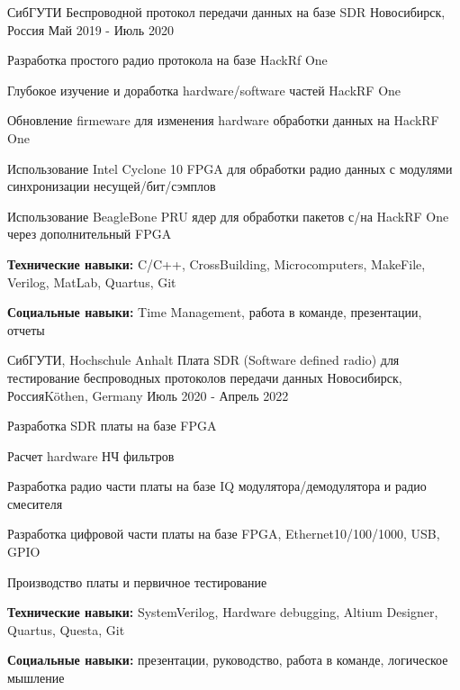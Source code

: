 

\begin{cventries}

  \cventry
    {СибГУТИ} %
    {Беспроводной протокол передачи данных на базе SDR} %
    {Новосибирск, Россия} %
    {Май 2019 - Июль 2020} %
    {
      \begin{cvitems} %
        \item {Разработка простого радио протокола на базе HackRf One}
        \item {Глубокое изучение и доработка hardware/software частей HackRF One}
        \item {Обновление firmeware для изменения hardware обработки данных на HackRF One}
        \item {Использование Intel Cyclone 10 FPGA для обработки радио данных с модулями синхронизации несущей/бит/сэмплов}
        \item {Использование BeagleBone PRU ядер для обработки пакетов с/на HackRF One через дополнительный FPGA}
        \item {\textbf{Технические навыки:} C/C++, CrossBuilding, Microcomputers, MakeFile, Verilog, MatLab, Quartus, Git}
        \item {\textbf{Социальные навыки:} Time Management, работа в команде, презентации, отчеты}
      \end{cvitems}
    }

  \cventry
    {СибГУТИ, Hochschule Anhalt} %
    {Плата SDR (Software defined radio) для тестирование беспроводных протоколов передачи данных} %
    {Новосибирск, Россия\newline Köthen, Germany} %
    {Июль 2020 - Апрель 2022} %
    {
      \begin{cvitems} %
        \item {Разработка SDR платы на базе FPGA}
        \item {Расчет hardware НЧ фильтров}
        \item {Разработка радио части платы на базе IQ модулятора/демодулятора и радио смесителя}
        \item {Разработка цифровой части платы на базе FPGA, Ethernet10/100/1000, USB, GPIO}
        \item {Производство платы и первичное тестирование}
        \item {\textbf{Технические навыки:} SystemVerilog, Hardware debugging, Altium Designer, Quartus, Questa, Git}
        \item {\textbf{Социальные навыки:} презентации, руководство, работа в команде, логическое мышление}
      \end{cvitems}
    }

\end{cventries}
